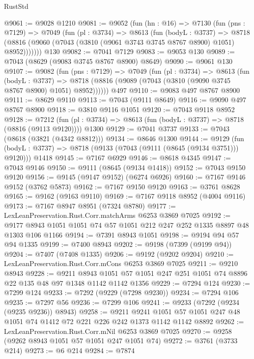 \begin{lexlean}{RustStd}
\begin{coremodule}
@9061 := @9028 @1210
@9081 := @9052
    (fun (hn : @16) =>
    @7130
      (fun (pns : @7129) =>
      @7049
        (fun (pl : @3734) =>
        @8613
          (fun (bodyL : @3737) =>
          @8718 (@8816 (@9060 (@7043 (@3810 (@9061 @3743 @3745 @8767 @8900) @1051) @8952)))))))
    @130
@9082 := @7041 @7129
@9083 := @9053 @130
@9089 := @7043 (@8629 (@9083 @3745 @8767 @8900) @8649)
@9090 := @9061 @130
@9107 := @9082
    (fun (pns : @7129) =>
    @7049
      (fun (pl : @3734) =>
      @8613
        (fun (bodyL : @3737) =>
        @8718 (@8816 (@9089 (@7043 (@3810 (@9090 @3745 @8767 @8900) @1051) @8952))))))
    @497
@9110 := @9083 @497 @8767 @8900
@9111 := @8629 @9110
@9113 := @7043 (@9111 @8649)
@9116 := @9090 @497 @8767 @8900
@9118 := @3810 @9116 @1051
@9120 := @7043 @9118 @8952
@9128 := @7212
    (fun (pl : @3734) => @8613 (fun (bodyL : @3737) => @8718 (@8816 (@9113 @9120))))
    @1300
@9129 := @7041 @3737
@9133 := @7043 (@8618 (@3821 (@4342 @8812)))
@9134 := @8646 @1300
@9144 := @9129
    (fun (bodyL : @3737) => @8718 (@9133 (@7043 (@9111 (@8645 (@9134 @3751))) @9120)))
    @1418
@9145 := @7167 @6929
@9146 := @8618 @4345
@9147 := @7043 @9146
@9150 := @9111 (@8645 (@9134 @1418))
@9152 := @7043 @9150 @9120
@9156 := @9145 (@9147 @9152) (@6274 @6926)
@9160 := @7167 @9146 @9152 (@3762 @5873)
@9162 := @7167 @9150 @9120
@9163 := @3761 @8628
@9165 := @9162 (@9163 @9110)
@9169 := @7167 @9118 @8952 (@4004 @9116)
@9173 := @7167 @8947 @8951 (@7324 @8780)
@9177 := LexLeanPreservation.Rust.Corr.matchArms @6253 @3869 @7025
@9192 := @9177 @8943 @1051 @1051 @74 @57 @1051 @212 @247 @252 @1335 @8897 @48 @1303 @106 @1166
@9194 := @7391 @8943 @1051
@9198 := @9194 @94 @57 @94 @1335
@9199 := @7400 @8943
@9202 := @9198 (@7399 (@9199 @94))
@9204 := @7407 (@7408 @1335)
@9206 := @9192 (@9202 @9204)
@9210 := LexLeanPreservation.Rust.Corr.mCons @6253 @3869 @7025
@9211 := @9210 @8943
@9228 := @9211
    @8943
    @1051
    @57
    @1051
    @247
    @251
    @1051
    @74
    @8896
    @22
    @135
    @48
    @97
    @1348
    @1142
    @1142
    @1356
@9229 := @7294 @124
@9230 := @7299 @124
@9233 := @7292 (@9229 (@7298 @9230))
@9234 := @7294 @106
@9235 := @7297 @56
@9236 := @7299 @106
@9241 := @9233 (@7292 (@9234 (@9235 @9236)) @8943)
@9258 := @9211
    @9241
    @1051
    @57
    @1051
    @247
    @48
    @1051
    @74
    @1412
    @72
    @221
    @226
    @242
    @1373
    @1142
    @1142
    @8892
@9262 := LexLeanPreservation.Rust.Corr.mNil @6253 @3869 @7025
@9270 := @9258 (@9262 @8943 @1051 @57 @1051 @247 @1051 @74)
@9272 := @3761 (@3733 @214)
@9273 := @6 @214
@9284 := @7874

\end{coremodule}
\end{lexlean}

